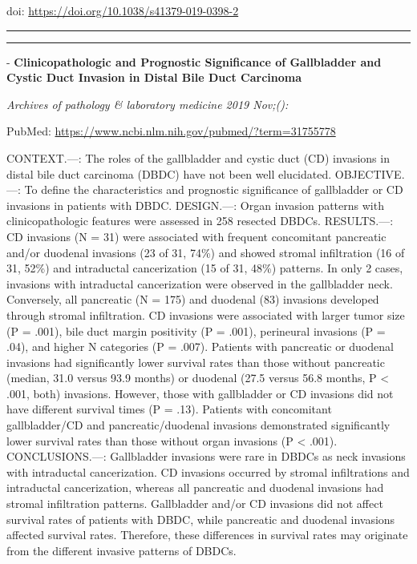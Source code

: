 \documentclass[
]{article}
\begin{document}
doi: \url{https://doi.org/10.1038/s41379-019-0398-2}

\begin{center}\rule{0.5\linewidth}{0.5pt}\end{center}

\begin{center}\rule{0.5\linewidth}{0.5pt}\end{center}

- \textbf{Clinicopathologic and Prognostic Significance of Gallbladder
and Cystic Duct Invasion in Distal Bile Duct Carcinoma}

\emph{Archives of pathology \& laboratory medicine 2019 Nov;():}

PubMed: \url{https://www.ncbi.nlm.nih.gov/pubmed/?term=31755778}

CONTEXT.---: The roles of the gallbladder and cystic duct (CD) invasions
in distal bile duct carcinoma (DBDC) have not been well elucidated.
OBJECTIVE.---: To define the characteristics and prognostic significance
of gallbladder or CD invasions in patients with DBDC. DESIGN.---: Organ
invasion patterns with clinicopathologic features were assessed in 258
resected DBDCs. RESULTS.---: CD invasions (N = 31) were associated with
frequent concomitant pancreatic and/or duodenal invasions (23 of 31,
74\%) and showed stromal infiltration (16 of 31, 52\%) and intraductal
cancerization (15 of 31, 48\%) patterns. In only 2 cases, invasions with
intraductal cancerization were observed in the gallbladder neck.
Conversely, all pancreatic (N = 175) and duodenal (83) invasions
developed through stromal infiltration. CD invasions were associated
with larger tumor size (P = .001), bile duct margin positivity (P =
.001), perineural invasions (P = .04), and higher N categories (P =
.007). Patients with pancreatic or duodenal invasions had significantly
lower survival rates than those without pancreatic (median, 31.0 versus
93.9 months) or duodenal (27.5 versus 56.8 months, P \textless{} .001,
both) invasions. However, those with gallbladder or CD invasions did not
have different survival times (P = .13). Patients with concomitant
gallbladder/CD and pancreatic/duodenal invasions demonstrated
significantly lower survival rates than those without organ invasions (P
\textless{} .001). CONCLUSIONS.---: Gallbladder invasions were rare in
DBDCs as neck invasions with intraductal cancerization. CD invasions
occurred by stromal infiltrations and intraductal cancerization, whereas
all pancreatic and duodenal invasions had stromal infiltration patterns.
Gallbladder and/or CD invasions did not affect survival rates of
patients with DBDC, while pancreatic and duodenal invasions affected
survival rates. Therefore, these differences in survival rates may
originate from the different invasive patterns of DBDCs.
\end{document}
